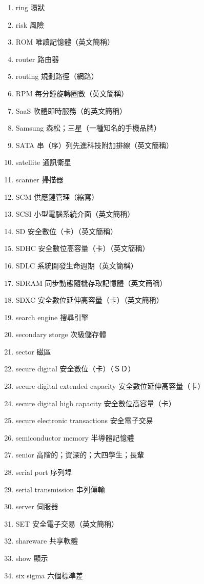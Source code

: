 \begin{enumerate}
  \item ring 環狀
  \item risk 風險
  \item ROM 唯讀記憶體（英文簡稱）
  \item router 路由器
  \item routing 規劃路徑（網路）
  \item RPM 每分鐘旋轉圈數（英文簡稱）
  \item SaaS 軟體即時服務（的英文簡稱）
  \item Samsung 森松；三星（一種知名的手機品牌）
  \item SATA 串（序）列先進科技附加排線（英文簡稱）
  \item satellite 通訊衛星
  \item scanner 掃描器
  \item SCM 供應鏈管理（縮寫）
  \item SCSI 小型電腦系統介面（英文簡稱）
  \item SD 安全數位（卡）（英文簡稱）
  \item SDHC 安全數位高容量（卡）（英文簡稱）
  \item SDLC 系統開發生命週期（英文簡稱）
  \item SDRAM 同步動態隨機存取記憶體（英文簡稱）
  \item SDXC 安全數位延伸高容量（卡）（英文簡稱）
  \item search engine 搜尋引擎
  \item secondary storge 次級儲存體
  \item sector 磁區
  \item secure digital 安全數位（卡）（ＳＤ）
  \item secure digital extended capacity 安全數位延伸高容量（卡）
  \item secure digital high capacity 安全數位高容量（卡）
  \item secure electronic transactions 安全電子交易
  \item semiconductor memory 半導體記憶體
  \item senior 高階的；資深的；大四學生；長輩
  \item serial port 序列埠
  \item serial transmission 串列傳輸
  \item server 伺服器
  \item SET 安全電子交易（英文簡稱）
  \item shareware 共享軟體
  \item show 顯示
  \item six sigma 六個標準差

\end{enumerate}
